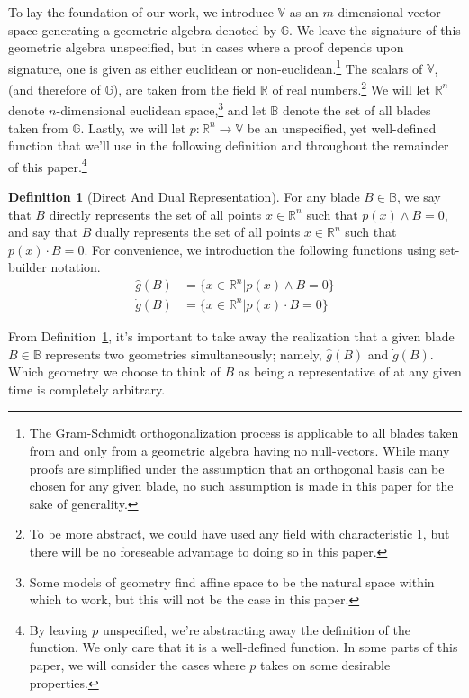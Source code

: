 \documentclass{birkjour}
\theoremstyle{definition}
\newtheorem{defn}[thm]{Definition}
\theoremstyle{remark}
\numberwithin{equation}{section}
\newcommand{\R}{\mathbb{R}}
\newcommand{\B}{\mathbb{B}}
\newcommand{\G}{\mathbb{G}}
\newcommand{\V}{\mathbb{V}}
\newcommand{\gd}{\dot{g}}
\newcommand{\gh}{\hat{g}}
\begin{document}
To lay the foundation of our work, we introduce $\V$ as an $m$-dimensional vector
space generating a geometric algebra denoted by $\G$.  We leave the signature of this geometric algebra
unspecified, but in cases where a proof depends upon signature, one is given as either
euclidean or non-euclidean.\footnote{The Gram-Schmidt orthogonalization process is applicable
to all blades taken from and only from a geometric algebra having no null-vectors.  While many proofs
are simplified under the assumption that an orthogonal basis can be chosen for any given blade, no such
assumption is made in this paper for the sake of generality.}
The scalars of $\V$, (and therefore of $\G$), are taken from the field $\R$ of real numbers.\footnote{To be more abstract,
we could have used any field with characteristic 1, but there will be no foreseable advantage to doing so in this paper.}
We will let $\R^n$ denote $n$-dimensional euclidean space,\footnote{Some models of geometry find affine space to be the natural
space within which to work, but this will not be the case in this paper.} and let $\B$ denote the set of all blades taken from $\G$.
Lastly, we will let $p:\R^n\to\V$ be an unspecified, yet well-defined function that we'll use in the following definition and
throughout the remainder of this paper.\footnote{By leaving $p$ unspecified, we're abstracting away the definition of the function.
We only care that it is a well-defined function.  In some parts of this paper, we will consider the cases where $p$ takes on some desirable
properties.}

\begin{defn}[Direct And Dual Representation]\label{def_blade_rep_geo}
For any blade $B\in\B$, we say that $B$ directly represents the set of all points $x\in\R^n$ such that
$p(x)\wedge B=0$, and say that $B$ dually represents the set of all points $x\in\R^n$ such that
$p(x)\cdot B=0$.  For convenience, we introduction the following functions using set-builder notation.
\begin{align*}
\gh(B) &= \{x\in\R^n|p(x)\wedge B=0\} \\
\gd(B) &= \{x\in\R^n|p(x)\cdot B=0\}
\end{align*}
\end{defn}
From Definition~\ref{def_blade_rep_geo}, it's important to take away the realization that a given blade $B\in\B$ represents two geometries
simultaneously; namely, $\gh(B)$ and $\gd(B)$.  Which geometry we choose to think of $B$ as being a representative of at any given time is completely
arbitrary.
\end{document}
